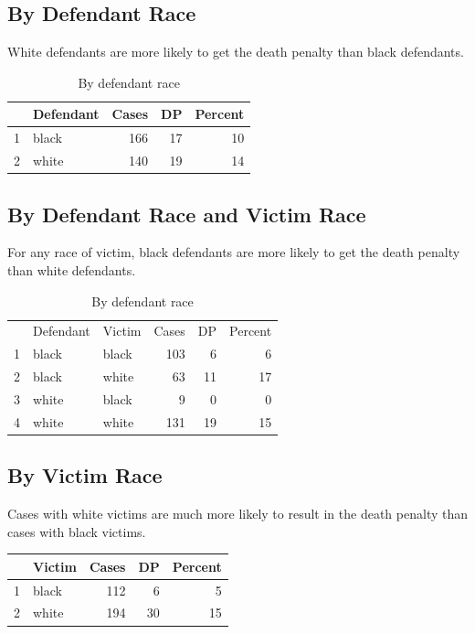\documentclass{exam}
\begin{document}
  \subsection{By Defendant Race}

  White defendants are more likely to get the death penalty than black defendants.

  \begin{table}[H]
    \centering
    \begin{tabular}{rlrrr}
      \toprule
        & Defendant & Cases & DP & Percent \\
      \midrule
      1 & black     & 166   & 17 & 10 \\
      2 & white     & 140   & 19 & 14 \\
      \bottomrule
    \end{tabular}
    \caption{By defendant race}
  \end{table}

  \subsection{By Defendant Race and Victim Race}

  For any race of victim, black defendants are more likely to get the death penalty than white defendants.

  \begin{table}[H]
    \centering
    \begin{tabular}{rllrrr}
      \hline
          & Defendant & Victim & Cases & DP & Percent \\
       1  & black     & black  & 103   & 6  & 6 \\
       2  & black     & white  & 63    & 11 & 17 \\
       3  & white     & black  & 9     & 0  & 0 \\
       4  & white     & white  & 131   & 19 & 15 \\
       \hline
    \end{tabular}
    \caption{By defendant race}
  \end{table}

  \subsection{By Victim Race}

  Cases with white victims are much more likely to result in the death penalty than cases with black victims.
  \begin{table}[H]
    \centering
    \begin{tabular}{rlrrr}
      \toprule
        & Victim & Cases & DP & Percent \\
      \midrule
      1 & black  & 112   & 6  & 5 \\
      2 & white  & 194   & 30 & 15 \\
      \bottomrule
    \end{tabular}
  \end{table}
\end{document}
